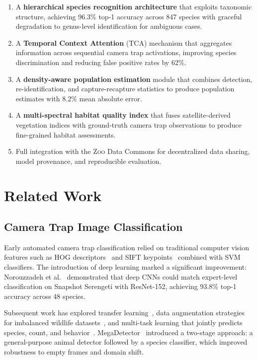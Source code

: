 \documentclass[11pt,letterpaper]{article}
\newcommand{\Zoo}{\textsc{Zoo}}
\begin{document}
\begin{enumerate}[leftmargin=*]
    \item A \textbf{hierarchical species recognition architecture} that exploits taxonomic structure, achieving 96.3\% top-1 accuracy across 847 species with graceful degradation to genus-level identification for ambiguous cases.
    \item A \textbf{Temporal Context Attention} (TCA) mechanism that aggregates information across sequential camera trap activations, improving species discrimination and reducing false positive rates by 62\%.
    \item A \textbf{density-aware population estimation} module that combines detection, re-identification, and capture-recapture statistics to produce population estimates with 8.2\% mean absolute error.
    \item A \textbf{multi-spectral habitat quality index} that fuses satellite-derived vegetation indices with ground-truth camera trap observations to produce fine-grained habitat assessments.
    \item Full integration with the \Zoo{} Data Commons for decentralized data sharing, model provenance, and reproducible evaluation.
\end{enumerate}

\section{Related Work}

\subsection{Camera Trap Image Classification}

Early automated camera trap classification relied on traditional computer vision features such as HOG descriptors~\cite{dalal2005} and SIFT keypoints~\cite{lowe2004} combined with SVM classifiers. The introduction of deep learning marked a significant improvement: Norouzzadeh et al.~\cite{norouzzadeh2018} demonstrated that deep CNNs could match expert-level classification on Snapshot Serengeti with ResNet-152, achieving 93.8\% top-1 accuracy across 48 species.

Subsequent work has explored transfer learning~\cite{tabak2019}, data augmentation strategies for imbalanced wildlife datasets~\cite{beery2019}, and multi-task learning that jointly predicts species, count, and behavior~\cite{willi2019}. MegaDetector~\cite{beery2019mega} introduced a two-stage approach: a general-purpose animal detector followed by a species classifier, which improved robustness to empty frames and domain shift.
\end{document}
